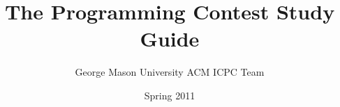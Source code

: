 \documentclass[11pt]{book}
\begin{document}
\author{George Mason University ACM ICPC Team}
\date{Spring 2011}
\title{The Programming Contest Study Guide}

\frontmatter
\maketitle
\tableofcontents

\mainmatter



\backmatter
\end{document}
